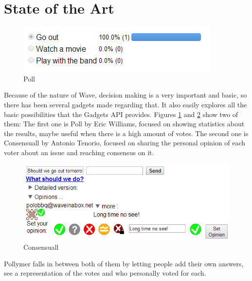 \section{State of the Art}
\label{subsec:decision_soa}
\begin{figure}[h]
  \center
    \includegraphics[keepaspectratio, scale=0.7]{Media/Captures/Extensions/DecisionGadgets/other.png}
  \caption{Poll}
  \label{fig:poll}
\end{figure}
Because of the nature of Wave, decision making is a very important and basic, so there has been several gadgets made regarding that. It also easily explores all the basic possibilities that the Gadgets API provides. Figures \ref{fig:poll} and \ref{fig:consensuall} show two of them: The first one is Poll by Eric Williams, focused on showing statistics about the results, maybe useful when there is a high amount of votes. The second one is Consensuall \cite{ref:consensuall} by Antonio Tenorio, focused on sharing the personal opinion of each voter about an issue and reaching consensus on it.\\[.2cm]
\begin{figure}[H]
  \center    
    \includegraphics[keepaspectratio, scale=0.7]{Media/Captures/Extensions/DecisionGadgets/consensuall.png}
  \caption{Consensuall}
  \label{fig:consensuall}
\end{figure}
Pollymer falls in between both of them by letting people add their own answers, see a representation of the votes and who personally voted for each.

